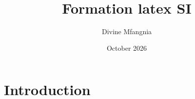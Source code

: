 \documentclass{article}
\title{Formation latex SI}
\author{Divine Mfangnia}
\date{October 2026}
\begin{document}
\maketitle

\section{Introduction}
\end{document}
